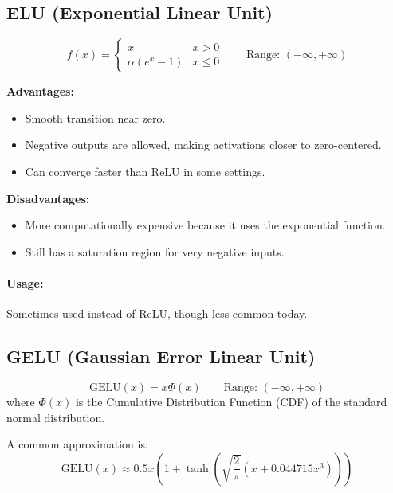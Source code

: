 \subsection{ELU (Exponential Linear Unit)}

\begin{equation}
f(x) = \begin{cases} x & x > 0 \\ \alpha(e^x - 1) & x \le 0 \end{cases} \qquad \text{Range: } (-\infty, +\infty)
\end{equation}

\eluplot

\begin{advbox}
\textbf{Advantages:}
\begin{itemize}
    \item Smooth transition near zero.
    \item Negative outputs are allowed, making activations closer to zero-centered.
    \item Can converge faster than ReLU in some settings.
\end{itemize}

\tcbline

\textbf{Disadvantages:}
\begin{itemize}
    \item More computationally expensive because it uses the exponential function.
    \item Still has a saturation region for very negative inputs.
\end{itemize}
\end{advbox}

\paragraph{Usage:} Sometimes used instead of ReLU, though less common today.

\subsection{GELU (Gaussian Error Linear Unit)}

\begin{equation}
\text{GELU}(x) = x \Phi(x) \qquad \text{Range: } (-\infty, +\infty)
\end{equation}
where $\Phi(x)$ is the Cumulative Distribution Function (CDF) of the standard normal distribution.

A common approximation is:
\begin{equation}
\text{GELU}(x) \approx 0.5x \left( 1 + \tanh\left( \sqrt{\frac{2}{\pi}} \left( x + 0.044715 x^3 \right) \right) \right)
\end{equation}

